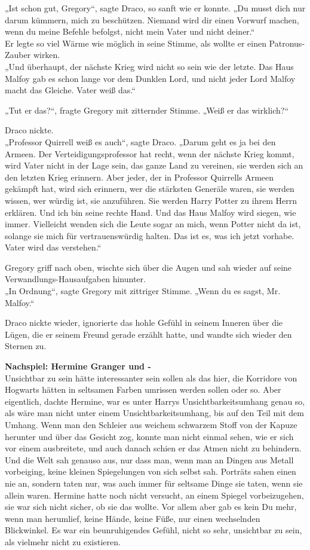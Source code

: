{„Ist schon gut, Gregory“, sagte Draco, so sanft wie er konnte. „Du musst dich nur darum kümmern, mich zu beschützen. Niemand wird dir einen Vorwurf machen, wenn du meine Befehle befolgst, nicht mein Vater und nicht deiner.“\\ Er legte so viel Wärme wie möglich in seine Stimme, als wollte er einen Patronus-Zauber wirken.\\ „Und überhaupt, der nächste Krieg wird nicht so sein wie der letzte. Das Haus Malfoy gab es schon lange vor dem Dunklen Lord, und nicht jeder Lord Malfoy macht das Gleiche. Vater weiß das.“

„Tut er das?“, fragte Gregory mit zitternder Stimme. „Weiß er das wirklich?“

Draco nickte.\\ „Professor Quirrell weiß es auch“, sagte Draco. „Darum geht es ja bei den Armeen. Der Verteidigungsprofessor hat recht, wenn der nächste Krieg kommt, wird Vater nicht in der Lage sein, das ganze Land zu vereinen, sie werden sich an den letzten Krieg erinnern. Aber jeder, der in Professor Quirrells Armeen gekämpft hat, wird sich erinnern, wer die stärksten Generäle waren, sie werden wissen, wer würdig ist, sie anzuführen. Sie werden Harry Potter zu ihrem Herrn erklären. Und ich bin seine rechte Hand. Und das Haus Malfoy wird siegen, wie immer. Vielleicht wenden sich die Leute sogar an mich, wenn Potter nicht da ist, solange sie mich für vertrauenswürdig halten. Das ist es, was ich jetzt vorhabe. Vater wird das verstehen.“

Gregory griff nach oben, wischte sich über die Augen und sah wieder auf seine Verwandlungs-Hausaufgaben hinunter.\\ „In Ordnung“, sagte Gregory mit zittriger Stimme. „Wenn du es sagst, Mr. Malfoy.“

Draco nickte wieder, ignorierte das hohle Gefühl in seinem Inneren über die Lügen, die er seinem Freund gerade erzählt hatte, und wandte sich wieder den Sternen zu.

\textbf{Nachspiel: Hermine Granger und -}\\ Unsichtbar zu sein hätte interessanter sein sollen als das hier, die Korridore von Hogwarts hätten in seltsamen Farben umrissen werden sollen oder so. Aber eigentlich, dachte Hermine, war es unter Harrys Unsichtbarkeitsumhang genau so, als wäre man nicht unter einem Unsichtbarkeitsumhang, bis auf den Teil mit dem Umhang. Wenn man den Schleier aus weichem schwarzem Stoff von der Kapuze herunter und über das Gesicht zog, konnte man nicht einmal sehen, wie er sich vor einem ausbreitete, und auch danach schien er das Atmen nicht zu behindern. Und die Welt sah genauso aus, nur dass man, wenn man an Dingen aus Metall vorbeiging, keine kleinen Spiegelungen von sich selbst sah. Porträts sahen einen nie an, sondern taten nur, was auch immer für seltsame Dinge sie taten, wenn sie allein waren. Hermine hatte noch nicht versucht, an einem Spiegel vorbeizugehen, sie war sich nicht sicher, ob sie das wollte. Vor allem aber gab es kein Du mehr, wenn man herumlief, keine Hände, keine Füße, nur einen wechselnden Blickwinkel. Es war ein beunruhigendes Gefühl, nicht so sehr, unsichtbar zu sein, als vielmehr nicht zu existieren.

}
